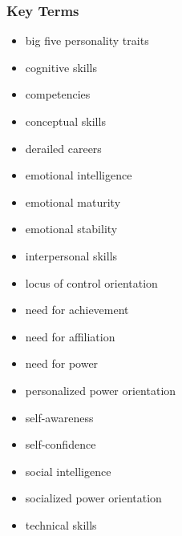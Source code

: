 
\subsubsection{Key Terms} %
\label{ssub:key_terms}
\begin{itemize}
	\item big five personality traits
	\item cognitive skills
	\item competencies
	\item conceptual skills
	\item derailed careers
	\item emotional intelligence
	\item emotional maturity
	\item emotional stability
	\item interpersonal skills
	\item locus of control orientation
	\item need for achievement
	\item need for affiliation
	\item need for power
	\item personalized power orientation
	\item self-awareness
	\item self-confidence
	\item social intelligence
	\item socialized power orientation
	\item technical skills
\end{itemize}

